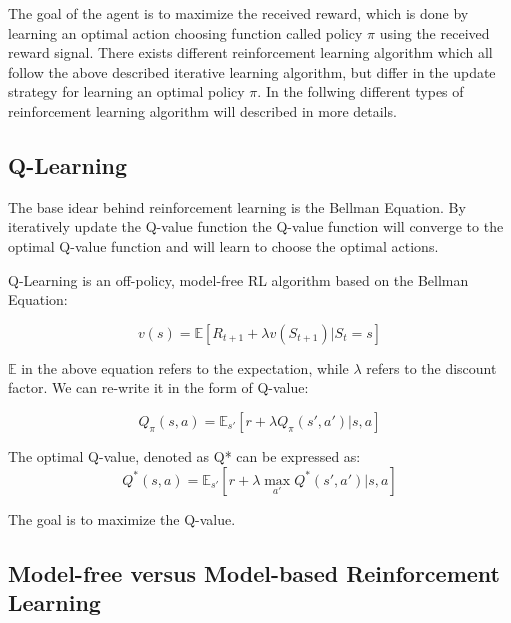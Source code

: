 
The goal of the agent is to maximize the received reward, which is done by learning an optimal action choosing function called policy $\pi$ using the received reward signal.
There exists different reinforcement learning algorithm which all follow the above described iterative learning algorithm, but differ in the update strategy for learning an optimal policy $\pi$. In the follwing different types of reinforcement learning algorithm will described in more details.

\subsection{Q-Learning}

The base idear behind reinforcement learning is the Bellman Equation. By iteratively update the Q-value function the Q-value function will converge to the optimal Q-value function and will learn to choose the optimal actions. 

Q-Learning is an off-policy, model-free RL algorithm based on the Bellman Equation:

\begin{equation}
v(s) = \mathbb{E} [R_{t+1} + \lambda v(S_{t+1}) | S_t = s]
\end{equation}

$\mathbb{E}$ in the above equation refers to the expectation, while $\lambda$ refers to the discount factor. We can re-write it in the form of Q-value:

\begin{equation}
Q_{\pi} (s, a) =\mathbb{E}_{s'} [r + \lambda Q_\pi(s', a') | s, a]
\end{equation}


The optimal Q-value, denoted as Q* can be expressed as:
\begin{equation}
Q^* (s, a) = \mathbb{E}_{s'} [r + \lambda \max_{a'} Q^*(s', a') | s, a]
\end{equation}

The goal is to maximize the Q-value.

\subsection{Model-free versus Model-based Reinforcement Learning}

